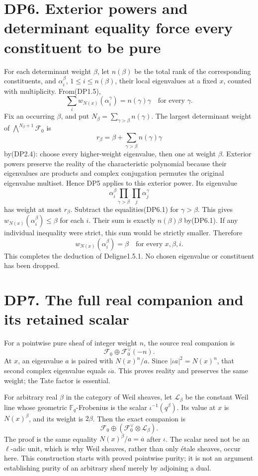 \documentclass[
]{report}
\begin{document}
\section{DP6. Exterior powers and determinant equality force every
constituent to be
pure}\label{dp6.-exterior-powers-and-determinant-equality-force-every-constituent-to-be-pure}

For each determinant weight \(\beta\), let \(n(\beta)\) be the total
rank of the corresponding constituents, and \(\alpha_i^\beta\),
\(1\le i\le n(\beta)\), their local eigenvalues at a fixed \(x\),
counted with multiplicity. From(DP1.5), \[
\sum_i w_{N(x)}(\alpha_i^\gamma)=n(\gamma)\gamma
\quad\text{for every }\gamma.
\tag{DP6.1}
\] Fix an occurring \(\beta\), and put
\(N_\beta=\sum_{\gamma>\beta}n(\gamma)\). The largest determinant weight
of \(\bigwedge^{N_\beta+1}\mathcal F_0\) is \[
r_\beta=\beta+\sum_{\gamma>\beta}n(\gamma)\gamma
\tag{DP6.2}
\] by(DP2.4): choose every higher-weight eigenvalue, then one at weight
\(\beta\). Exterior powers preserve the reality of the characteristic
polynomial because their eigenvalues are products and complex
conjugation permutes the original eigenvalue multiset. Hence DP5 applies
to this exterior power. Its eigenvalue \[
\alpha_i^\beta\prod_{\gamma>\beta}\prod_j\alpha_j^\gamma
\tag{DP6.3}
\] has weight at most \(r_\beta\). Subtract the equalities(DP6.1) for
\(\gamma>\beta\). This gives \(w_{N(x)}(\alpha_i^\beta)\le\beta\) for
each \(i\). Their sum is exactly \(n(\beta)\beta\) by(DP6.1). If any
individual inequality were strict, this sum would be strictly smaller.
Therefore \[
\boxed{w_{N(x)}(\alpha_i^\beta)=\beta
\quad\text{for every }x,\beta,i.}
\tag{DP6.4}
\] This completes the deduction of Deligne1.5.1. No chosen eigenvalue or
constituent has been dropped.

\section{DP7. The full real companion and its retained
scalar}\label{dp7.-the-full-real-companion-and-its-retained-scalar}

For a pointwise pure sheaf of integer weight \(n\), the source real
companion is \[
\mathcal F_0\oplus\mathcal F_0^\vee(-n).
\tag{DP7.1}
\] At \(x\), an eigenvalue \(a\) is paired with \(N(x)^n/a\). Since
\(|\iota a|^2=N(x)^n\), that second complex eigenvalue equals
\(\overline{\iota a}\). This proves reality and preserves the same
weight; the Tate factor is essential.

For arbitrary real \(\beta\) in the category of Weil sheaves, let
\(\mathcal L_{\beta}\) be the constant Weil line whose geometric
\(\mathbb F_q\)-Frobenius is the scalar \(\iota^{-1}(q^\beta)\). Its
value at \(x\) is \(N(x)^\beta\), and its weight is \(2\beta\). Then the
exact companion is \[
\mathcal F_0\oplus(\mathcal F_0^\vee\otimes\mathcal L_\beta).
\tag{DP7.2}
\] The proof is the same equality \(N(x)^\beta/a=\overline a\) after
\(\iota\). The scalar need not be an \(\ell\)-adic unit, which is why
Weil sheaves, rather than only étale sheaves, occur here. This
construction starts with proved pointwise purity; it is not an argument
establishing purity of an arbitrary sheaf merely by adjoining a dual.
\end{document}
